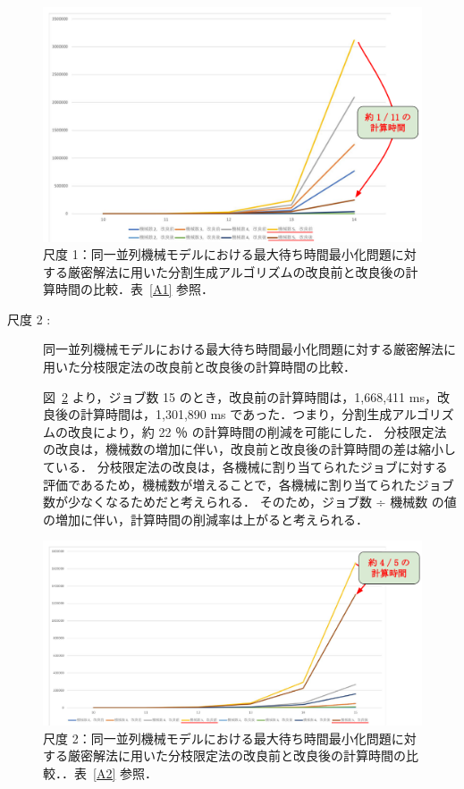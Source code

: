 \documentclass[12pt]{optlab-bachelor}
\begin{document}
\begin{figure}[h]
  \centering
  \includegraphics[width = 13cm]{figure/rgfTimeId.pdf}
  \caption{尺度 1：同一並列機械モデルにおける最大待ち時間最小化問題に対する厳密解法に用いた分割生成アルゴリズムの改良前と改良後の計算時間の比較．表~\ref{A1} 参照．}
  \label{5.1}
\end{figure}


\begin{description}
  \item[尺度 2 :] 同一並列機械モデルにおける最大待ち時間最小化問題に対する厳密解法に用いた分枝限定法の改良前と改良後の計算時間の比較．

  図~\ref{5.2} より，ジョブ数 15 のとき，改良前の計算時間は，1,668,411 ms，改良後の計算時間は，1,301,890 ms であった．つまり，分割生成アルゴリズムの改良により，約 22 ％ の計算時間の削減を可能にした．
  分枝限定法の改良は，機械数の増加に伴い，改良前と改良後の計算時間の差は縮小している．
  分枝限定法の改良は，各機械に割り当てられたジョブに対する評価であるため，機械数が増えることで，各機械に割り当てられたジョブ数が少なくなるためだと考えられる．
  そのため，ジョブ数 ÷ 機械数 の値の増加に伴い，計算時間の削減率は上がると考えられる．
\end{description}

\begin{figure}[h]
  \centering
  \includegraphics[width = 16cm]{figure/BandBTimeId.pdf}
  \caption{尺度 2：同一並列機械モデルにおける最大待ち時間最小化問題に対する厳密解法に用いた分枝限定法の改良前と改良後の計算時間の比較．．表~\ref{A2} 参照．}
  \label{5.2}
\end{figure}
\end{document}
